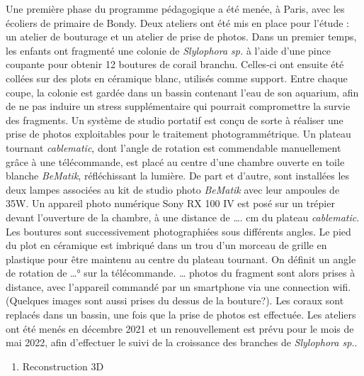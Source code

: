 \documentclass[]{article}
\providecommand{\tightlist}{%
  \setlength{\itemsep}{0pt}\setlength{\parskip}{0pt}}
\begin{document}
Une première phase du programme pédagogique a été menée, à Paris, avec
les écoliers de primaire de Bondy. Deux ateliers ont été mis en place
pour l'étude : un atelier de bouturage et un atelier de prise de photos.
Dans un premier temps, les enfants ont fragmenté une colonie de
\emph{Slylophora sp.} à l'aide d'une pince coupante pour obtenir 12
boutures de corail branchu. Celles-ci ont ensuite été collées sur des
plots en céramique blanc, utilisés comme support. Entre chaque coupe, la
colonie est gardée dans un bassin contenant l'eau de son aquarium, afin
de ne pas induire un stress supplémentaire qui pourrait compromettre la
survie des fragments. Un système de studio portatif est conçu de sorte à
réaliser une prise de photos exploitables pour le traitement
photogrammétrique. Un plateau tournant \emph{cablematic}, dont l'angle
de rotation est commendable manuellement grâce à une télécommande, est
placé au centre d'une chambre ouverte en toile blanche \emph{BeMatik},
réfléchissant la lumière. De part et d'autre, sont installées les deux
lampes associées au kit de studio photo \emph{BeMatik} avec leur
ampoules de 35W. Un appareil photo numérique Sony RX 100 IV est posé sur
un trépier devant l'ouverture de la chambre, à une distance de \ldots{}.
cm du plateau \emph{cablematic}. Les boutures sont successivement
photographiées sous différents angles. Le pied du plot en céramique est
imbriqué dans un trou d'un morceau de grille en plastique pour être
maintenu au centre du plateau tournant. On définit un angle de rotation
de \ldots{}° sur la télécommande. \ldots{} photos du fragment sont alors
prises à distance, avec l'appareil commandé par un smartphone via une
connection wifi. (Quelques images sont aussi prises du dessus de la
bouture?). Les coraux sont replacés dans un bassin, une fois que la
prise de photos est effectuée. Les ateliers ont été menés en décembre
2021 et un renouvellement est prévu pour le mois de mai 2022, afin
d'effectuer le suivi de la croissance des branches de \emph{Slylophora
sp.}.

\begin{enumerate}
\def\labelenumi{\arabic{enumi})}
\setcounter{enumi}{1}
\tightlist
\item
  Reconstruction 3D
\end{enumerate}
\end{document}
